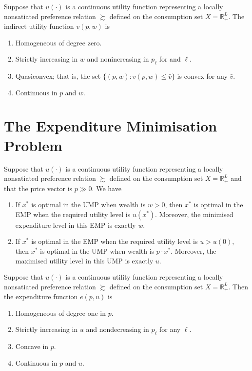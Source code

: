 \begin{prop}
    Suppose that $u(\cdot)$ is a continuous utility function representing a locally nonsatiated preference relation $\succsim$ defined on the consumption set $X = \mathbb{R}^L_+$. The indirect utility function $v(p, w)$ is
    \begin{enumerate}
        \item Homogeneous of degree zero.
        \item Strictly increasing in $w$ and nonincreasing in $p_\ell$ for and $\ell$.
        \item Quasiconvex; that is, the set $\{(p, w): v(p, w) \leq \bar{v}\}$ is convex for any $\bar{v}$.
        \item Continuous in $p$ and $w$.
    \end{enumerate}
\end{prop}


\section{The Expenditure Minimisation Problem}

\begin{prop}
    Suppose that $u(\cdot)$ is a continuous utility function representing a locally nonsatiated preference relation $\succsim$ defined on the consumption set $X = \mathbb{R}^L_+$ and that the price vector is $p \gg 0$. We have
    \begin{enumerate}
        \item If $x^*$ is optimal in the UMP when wealth is $w > 0$, then $x^*$ is optimal in the EMP when the required utility level is $u(x^*)$. Moreover, the minimised expenditure level in this EMP is exactly $w$.
        \item If $x^*$ is optimal in the EMP when the required utility level is $u > u(0)$, then $x^*$ is optimal in the UMP when wealth is $p \cdot x^*$. Moreover, the maximised utility level in this UMP is exactly $u$.
    \end{enumerate}
\end{prop}

\begin{prop}
    Suppose that $u(\cdot)$ is a continuous utility function representing a locally nonsatiated preference relation $\succsim$ defined on the consumption set $X = \mathbb{R}^L_+$. Then the expenditure function $e(p, u)$ is 
    \begin{enumerate}
        \item Homogeneous of degree one in $p$.
        \item Strictly increasing in $u$ and nondecreasing in $p_\ell$ for any $\ell$.
        \item Concave in $p$.
        \item Continuous in $p$ and $u$.
    \end{enumerate}
\end{prop}

